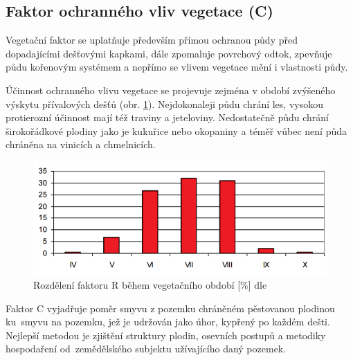 \subsection{Faktor ochranného vliv vegetace (C)}
Vegetační faktor se uplatňuje především přímou ochranou půdy před
dopadajícími dešťovými kapkami, dále zpomaluje povrchový odtok,
zpevňuje půdu kořenovým systémem a nepřímo se vlivem vegetace mění i
vlastnosti půdy.

Účinnost ochranného vlivu vegetace se projevuje zejména v období
zvýšeného výskytu přívalových dešťů
(obr. \ref{fig:r_faktor_graph}). Nejdokonaleji půdu chrání les,
vysokou protierozní účinnost mají též traviny a
jeteloviny. Nedostatečně půdu chrání širokořádkové plodiny jako je
kukuřice nebo okopaniny a téměř vůbec není půda chráněna na vinicích a
chmelnicích.
\vspace{-10pt}
\begin{figure}[H]
    \centering
    \includegraphics[scale=0.6]{./pictures/r_factor_graph.png}
      \caption[Rozdělení faktoru R během vegetačního období]{Rozdělení
        faktoru R během vegetačního období [\%] dle
        \cite{janecek2012}}
      \label{fig:r_faktor_graph}
\end{figure}
\vspace{-16pt} Faktor C vyjadřuje poměr smyvu z pozemku chráněném
pěstovanou plodinou ku~smyvu na pozemku, jež je udržován jako úhor,
kypřený po každém dešti. Nejlepší metodou je zjištění struktury
plodin, osevních postupů a metodiky hospodaření od~zemědělského
subjektu užívajícího daný pozemek.

